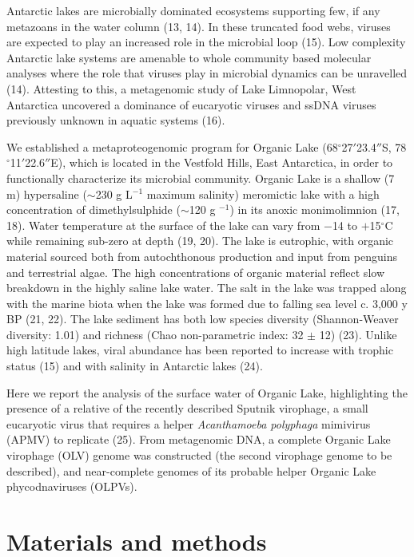 Antarctic lakes are microbially dominated ecosystems supporting few, if any metazoans in the water column (13, 14). 
In these truncated food webs, viruses are expected to play an increased role in the microbial loop (15). 
Low complexity Antarctic lake systems are amenable to whole community based molecular analyses where the role that viruses play in microbial dynamics can be unravelled (14). 
Attesting to this, a metagenomic study of Lake Limnopolar, West Antarctica uncovered a dominance of eucaryotic viruses and ssDNA viruses previously unknown in aquatic systems (16). 

We established a metaproteogenomic program for Organic Lake (68$^{\circ}$27$'$23.4$''$S, 78$^{\circ}$11$'$22.6$''$E), which is located in the Vestfold Hills, East Antarctica, in order to functionally characterize its microbial community. 
Organic Lake is a shallow (7 m) hypersaline ($\sim$230 g L$^{-1}$ maximum salinity) meromictic lake with a high concentration of dimethylsulphide ($\sim$120 \textmu{}g $^{-1}$) in its anoxic monimolimnion (17, 18). 
Water temperature at the surface of the lake can vary from $-$14 to $+$15$^{\circ}$C while remaining sub-zero at depth (19, 20). 
The lake is eutrophic, with organic material sourced both from autochthonous production and input from penguins and terrestrial algae. 
The high concentrations of organic material reflect slow breakdown in the highly saline lake water. 
The salt in the lake was trapped along with the marine biota when the lake was formed due to falling sea level c. 3,000 y BP (21, 22). The lake sediment has both low species diversity (Shannon-Weaver diversity: 1.01) and richness (Chao non-parametric index: 32 $\pm$ 12) (23). 
Unlike high latitude lakes, viral abundance has been reported to increase with trophic status (15) and with salinity in Antarctic lakes (24). 

Here we report the analysis of the surface water of Organic Lake, highlighting the presence of a relative of the recently described Sputnik virophage, a small eucaryotic virus that requires a helper \emph{Acanthamoeba polyphaga} mimivirus (APMV) to replicate (25). 
From metagenomic DNA, a complete Organic Lake virophage (OLV) genome was constructed (the second virophage genome to be described), and near-complete genomes of its probable helper Organic Lake phycodnaviruses (OLPVs).


\section{Materials and methods}

